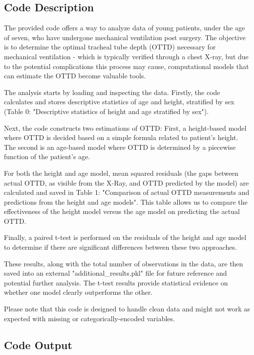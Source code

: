 \documentclass[11pt]{article}
\begin{document}
\subsection{Code Description}

The provided code offers a way to analyze data of young patients, under the age of seven, who have undergone mechanical ventilation post surgery. The objective is to determine the optimal tracheal tube depth (OTTD) necessary for mechanical ventilation - which is typically verified through a chest X-ray, but due to the potential complications this process may cause, computational models that can estimate the OTTD become valuable tools. 

The analysis starts by loading and inspecting the data. Firstly, the code calculates and stores descriptive statistics of age and height, stratified by sex (Table 0: "Descriptive statistics of height and age stratified by sex"). 

Next, the code constructs two estimations of OTTD: First, a height-based model where OTTD is decided based on a simple formula related to patient's height. The second is an age-based model where OTTD is determined by a piecewise function of the patient's age. 

For both the height and age model, mean squared residuals (the gaps between actual OTTD, as visible from the X-Ray, and OTTD predicted by the model) are calculated and saved in Table 1: "Comparison of actual OTTD measurements and predictions from the height and age models". This table allows us to compare the effectiveness of the height model versus the age model on predicting the actual OTTD.

Finally, a paired t-test is performed on the residuals of the height and age model to determine if there are significant differences between these two approaches. 

These results, along with the total number of observations in the data, are then saved into an external "additional\_results.pkl" file for future reference and potential further analysis. The t-test results provide statistical evidence on whether one model clearly outperforms the other.

Please note that this code is designed to handle clean data and might not work as expected with missing or categorically-encoded variables.

\subsection{Code Output}
\end{document}
